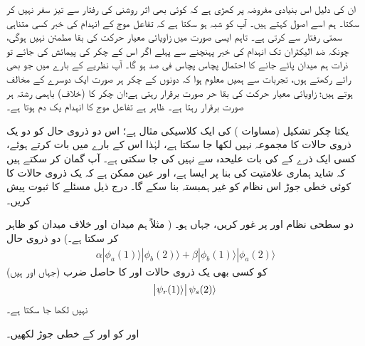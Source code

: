 ان کی دلیل اس بنیادی مفروضہ پر کھڑی ہے کہ کوئی بھی اثر روشنی کی رفتار سے تیز سفر نہیں کر سکتا۔ ہم اسے اصول  کہتے ہیں۔ آپ کو شبہ ہو سکتا ہے کہ تفاعل موج کے انہدام کی خبر کسی متناہی سمتی رفتار سے  کرتی ہے۔ تاہم ایسی صورت میں زاویائی معیار حرکت کی بقا مطمئن نہیں ہوگی، چونکہ ضد الیکٹران تک انہدام کی خبر پہنچنے سے پہلے اگر اس کے چکر کی پیمائش کی جائے تو  ذرات ہم میدان پائے جانے کا احتمال پچاس پچاس فی صد ہو گا۔ آپ نظریے کے بارے میں جو بھی رائے رکھتے ہوں، تجربات سے ہمیں معلوم ہوا کہ دونوں کے چکر ہر صورت ایک دوسرے کے مخالف ہوتے ہیں؛ زاویائی معیار حرکت کی بقا حر صورت برقرار رہتی ہے؛ان چکر کا (خلاف) باہمی رشتہ ہر صورت برقرار رہتا ہے۔ ظاہر ہے تفاعل موج کا انہدام یک دم ہوتا ہے۔

 یکتا چکر تشکیل (مساوات )  کی ایک کلاسیکی مثال ہے؛ اس دو ذروی حال کو دو یک ذروی حالات کا مجموعہ نہیں لکھا جا سکتا ہے، لہٰذا اس کے بارے میں بات کرتے ہوئے، کسی ایک ذرے کے  کی بات علیحدہ سے نہیں کی جا سکتی ہے۔ آپ گمان کر سکتے ہیں کہ شاید ہماری علامتیت کی بنا پر ایسا ہے، اور عین ممکن ہے کہ یک ذروی حالات کا کوئی خطی جوڑ اس نظام کو غیر ہمبستہ بنا سکے گا۔ درج ذیل مسئلے کا ثبوت پیش کریں۔

دو سطحی نظام  اور  پر غور کریں، جہاں  ہو۔
( مثلاً  ہم میدان اور  خلاف میدان کو ظاہر کر سکتا ہے۔) دو ذروی حال 
\begin{align*}
	\alpha|\phi_a(1)\rangle|\phi_b(2)\rangle+\beta|\phi_b(1)\rangle|\phi_a(2)\rangle
\end{align*}
(جہاں  اور  ہیں) کو کسی بھی یک ذروی حالات  اور  کا حاصل ضرب
\begin{align*}
	\abs{\psi_r(1)\rangle}\psi_s(2)\rangle
\end{align*}
نہیں لکھا جا سکتا ہے۔

  اور  کو  اور  کے خطی جوڑ لکھیں۔


